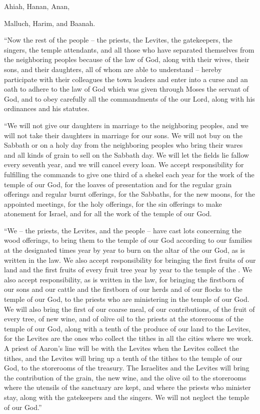 {\par }{\PP {}Ahiah,
Hanan,
Anan,
\par }{\PP {}Malluch,
Harim,
and Baanah.
\par }{\PP {}“Now the rest
of the people
– the priests,
the Levites,
the gatekeepers,
the singers,
the temple attendants,
and all
those who have separated
themselves from the neighboring
peoples
because of the law
of God,
along with their wives,
their sons,
and their daughters,
all
of whom are able to understand –
hereby participate
with
their colleagues
the town leaders
and enter into
a curse
and an oath
to adhere to
the law
of God
which
was given
through
Moses
the servant
of God,
and to obey carefully
all
the commandments
of the
{}
our Lord,
along with his ordinances
and his statutes.
\par }{\PP {}“We will not
give
our daughters
in marriage to the neighboring
peoples,
and we will not
take
their daughters
in marriage for our sons.
We will not
buy on the Sabbath
or on a holy
day
from the
neighboring
peoples
who bring
their wares
and all
kinds of grain
to sell
on the Sabbath
day.
We will let the fields lie fallow
every seventh
year,
and we will cancel
every
loan.
We accept responsibility for fulfilling
the commands
to give
one third
of a shekel
each year
for the work
of the temple
of our God,
for the loaves
of presentation
and for the regular
grain offerings
and regular
burnt offerings,
for the Sabbaths,
for the new moons,
for the appointed meetings,
for the holy
offerings, for the sin offerings
to make atonement
for
Israel,
and for all
the work
of the temple
of our God.
\par }{\PP {}“We – the priests, the Levites, and the people – have cast lots concerning the wood offerings, to bring them to the temple of our God according to our families at the designated times year by year to burn on the altar of the
{} our God, as is written in the law.
We also accept responsibility for bringing
the first fruits
of our land
and the first fruits
of every
fruit
tree
year
by year
to the temple
of the
{}.
We also accept responsibility, as is written
in the law,
for bringing
the firstborn
of our sons
and our cattle
and the firstborn
of our herds
and of our flocks
to the temple
of our God,
to the priests
who are ministering
in the temple
of our God.
We will also bring
the first
of our coarse meal,
of our contributions,
of the fruit
of every
tree,
of new wine,
and of olive oil
to the priests
at
the storerooms
of the temple
of our God,
along with a tenth
of the produce of our land
to the Levites,
for the Levites
are the ones who collect the tithes
in all
the cities
where we work.
A priest
of Aaron’s
line will be
with
the Levites
when the Levites
collect the tithes,
and the Levites
will bring up
a tenth
of the tithes
to the temple
of our God,
to
the storerooms
of the treasury.
The Israelites
and the Levites
will bring
the contribution
of the grain,
the new wine,
and the olive oil
to the storerooms
where
the utensils
of the sanctuary
are kept, and where the priests
who minister
stay, along with the gatekeepers
and the singers.
We will not
neglect
the temple
of our God.”

}
